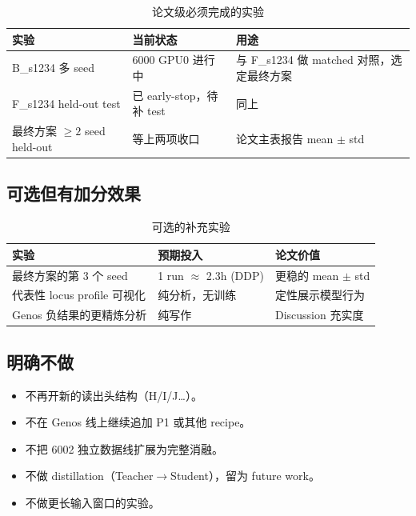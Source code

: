 \documentclass[11pt,a4paper]{ctexart}
\begin{document}
\begin{table}[H]
\centering
\small
\caption{论文级必须完成的实验}
\begin{tabular}{lll}
\toprule
实验 & 当前状态 & 用途 \\
\midrule
B\_s1234 多 seed & 6000 GPU0 进行中 & 与 F\_s1234 做 matched 对照，选定最终方案 \\
F\_s1234 held-out test & 已 early-stop，待补 test & 同上 \\
最终方案 $\geq 2$ seed held-out & 等上两项收口 & 论文主表报告 mean $\pm$ std \\
\bottomrule
\end{tabular}
\end{table}

\subsection{可选但有加分效果}

\begin{table}[H]
\centering
\small
\caption{可选的补充实验}
\begin{tabular}{lll}
\toprule
实验 & 预期投入 & 论文价值 \\
\midrule
最终方案的第 3 个 seed & 1 run $\approx$ 2.3h (DDP) & 更稳的 mean $\pm$ std \\
代表性 locus profile 可视化 & 纯分析，无训练 & 定性展示模型行为 \\
Genos 负结果的更精炼分析 & 纯写作 & Discussion 充实度 \\
\bottomrule
\end{tabular}
\end{table}

\subsection{明确不做}

\begin{itemize}[leftmargin=2em]
  \item 不再开新的读出头结构（H/I/J\ldots）。
  \item 不在 Genos 线上继续追加 P1 或其他 recipe。
  \item 不把 6002 独立数据线扩展为完整消融。
  \item 不做 distillation（Teacher$\to$Student），留为 future work。
  \item 不做更长输入窗口的实验。
\end{itemize}

\end{document}
